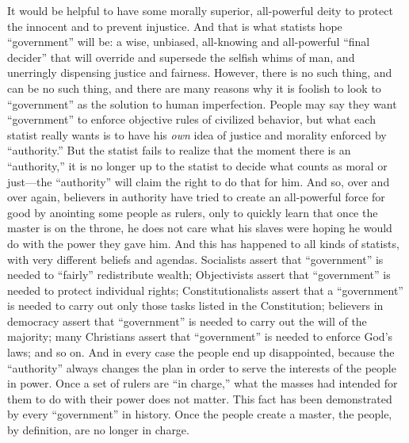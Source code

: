 \documentclass{book}
\begin{document}
It would be helpful to have some morally superior, all-powerful deity to protect the innocent and to prevent injustice. And that is what statists hope \enquote{government} will be: a wise, unbiased, all-knowing and all-powerful \enquote{final decider} that will override and supersede the selfish whims of man, and unerringly dispensing justice and fairness. However, there is no such thing, and can be no such thing, and there are many reasons why it is foolish to look to \enquote{government} as the solution to human imperfection. People may say they want \enquote{government} to enforce objective rules of civilized behavior, but what each statist really wants is to have his \emph{own} idea of justice and morality enforced by \enquote{authority.} But the statist fails to realize that the moment there is an \enquote{authority,} it is no longer up to the statist to decide what counts as moral or just---the \enquote{authority} will claim the right to do that for him. And so, over and over again, believers in authority have tried to create an all-powerful force for good by anointing some people as rulers, only to quickly learn that once the master is on the throne, he does not care what his slaves were hoping he would do with the power they gave him. And this has happened to all kinds of statists, with very different beliefs and agendas. Socialists assert that \enquote{government} is needed to \enquote{fairly} redistribute wealth; Objectivists assert that \enquote{government} is needed to protect individual rights; Constitutionalists assert that a \enquote{government} is needed to carry out only those tasks listed in the Constitution; believers in democracy assert that \enquote{government} is needed to carry out the will of the majority; many Christians assert that \enquote{government} is needed to enforce God's laws; and so on. And in every case the people end up disappointed, because the \enquote{authority} always changes the plan in order to serve the interests of the people in power. Once a set of rulers are \enquote{in charge,} what the masses had intended for them to do with their power does not matter. This fact has been demonstrated by every \enquote{government} in history. Once the people create a master, the people, by definition, are no longer in charge.
\end{document}
